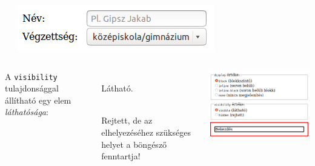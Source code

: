 \begin{frame}
  \begin{columns}[c]
      \begin{exampleblock}{}
        \scriptsize
        
      \end{exampleblock}
      \includegraphics[width=\textwidth]{../css1/meretezes.png}
  \end{columns}
\end{frame}

\begin{frame}
  \begin{columns}[c]
      A \texttt{visibility} tulajdonsággal állítható egy elem \emph{láthatósága}:
      \begin{description}[m]
        \item[\texttt{visible}] \hfill \\ Látható.
        \item[\texttt{hidden}] \hfill \\ Rejtett, de az elhelyezéséhez szükséges helyet a böngésző fenntartja!
      \end{description}
      \begin{exampleblock}{}
        \includegraphics[width=\textwidth]{display.png}
      \end{exampleblock}
  \end{columns}
  
\end{frame}

